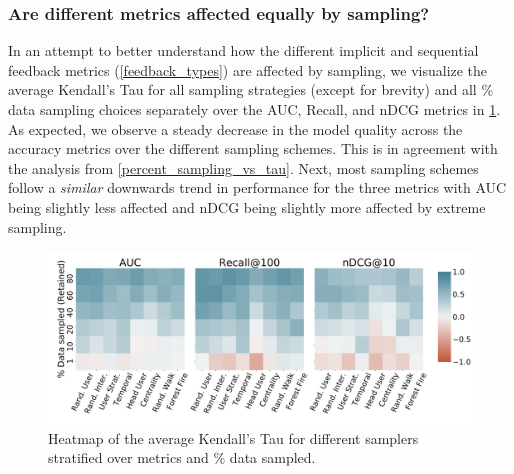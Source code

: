 \subsubsection{Are different metrics affected equally by sampling? \ \ } In an attempt to better understand how the different implicit and sequential feedback metrics (\cref{feedback_types}) are affected by sampling, we visualize the average Kendall's Tau for all sampling strategies (except \sampler for brevity) and all \% data sampling choices separately over the AUC, Recall, and nDCG metrics in \cref{metric_correlation}. As expected, we observe a steady decrease in the model quality across the accuracy metrics over the different sampling schemes. This is in agreement with the analysis from \cref{percent_sampling_vs_tau}. Next, most sampling schemes follow a \emph{similar} downwards trend in performance for the three metrics with AUC being slightly less affected and nDCG being slightly more affected by extreme sampling.
\begin{figure}[ht!] 
    \vspace{-0.1cm}
    \includegraphics[width=\linewidth]{figures/percent_sampling_vs_sampler.pdf}
    \vspace{-0.8cm}
    \caption{Heatmap of the average Kendall's Tau for different samplers stratified over metrics and \% data sampled.}
    \label{metric_correlation}
    \vspace{-0.5cm}
\end{figure}
